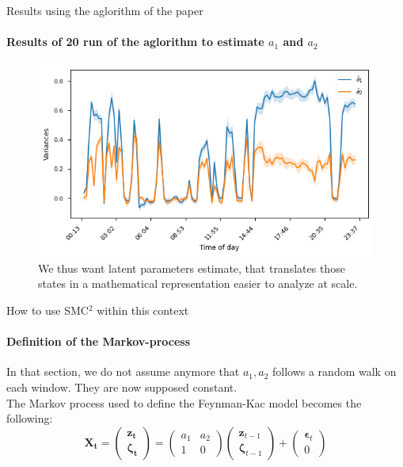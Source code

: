 \documentclass[dvipsnames, handout]{beamer}
\begin{document}
\begin{frame}{Results using the aglorithm of the paper}
\framesubtitle{Results of 20 run of the aglorithm to estimate $a_1$ and $a_2$}

\begin{figure}
\centering
    \centering
    \includegraphics[width=\linewidth]{a1_a2_var_0.5.png}
    \caption{We thus want latent parameters estimate, that translates those states in a mathematical representation easier to analyze at scale.}
    \label{fig:paper_results}
\end{figure}

\end{frame}

\begin{frame}{How to use SMC$^2$ within this context}
\framesubtitle{Definition of the Markov-process}

In that section, we do not assume anymore that $a_1, a_2$ follows a random walk on each window. They are now supposed constant.
\newline
\\
The Markov process used to define the Feynman-Kac model becomes the following:
\begin{equation}
    \mathbf{X_t} =
    \begin{pmatrix}
    \mathbf{z_t}\\\mathbf{\zeta_t}
    \end{pmatrix}
    =
    \begin{pmatrix}
    a_1& a_2\\
    1 & 0

    \end{pmatrix}
    \begin{pmatrix}
    \mathbf{z}_{t-1}\\\mathbf{\zeta}_{t-1}
    \end{pmatrix}
    +
    \begin{pmatrix}
    \mathbf{\epsilon}_t \\ 0
    \end{pmatrix}
\end{equation}

\end{frame}
\end{document}

